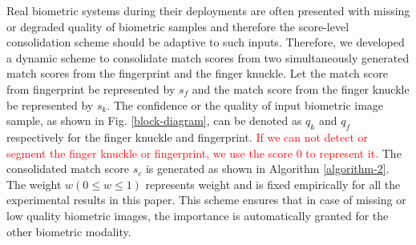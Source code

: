 Real biometric systems during their deployments are often presented with missing or degraded quality of biometric samples and therefore the score-level consolidation scheme should be adaptive to such inputs. Therefore, we developed a dynamic scheme to consolidate match scores from two simultaneously generated match scores from the fingerprint and the finger knuckle. Let the match score from fingerprint be represented by $s_f$ and the match score from the finger knuckle be represented by $s_k$. The confidence or the quality of input biometric image sample, as shown in Fig. \ref{block-diagram}, can be denoted as $q_k$ and $q_f$ respectively for the finger knuckle and fingerprint. \textcolor{red}{If we can not detect or segment the finger knuckle or fingerprint, we use the score 0 to represent it.} The consolidated match score $s_c$ is generated as shown in Algorithm \ref{algorithm-2}. The weight $w ( 0 \leq w \leq 1)$  represents weight and is fixed empirically for all the experimental results in this paper. This scheme ensures that in case of missing or low quality biometric images, the importance is automatically granted for the other biometric modality.  

